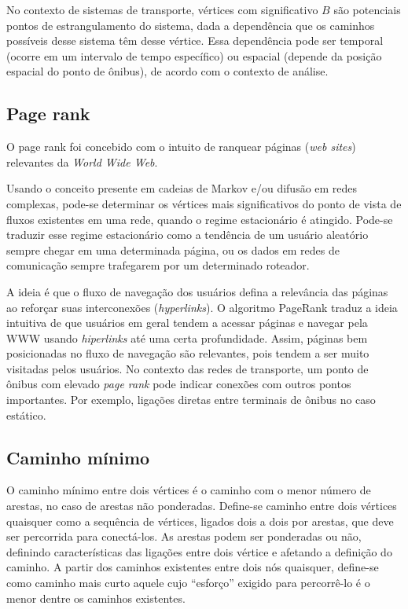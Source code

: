 No contexto de sistemas de transporte, vértices com significativo $B$ são potenciais pontos de estrangulamento do sistema, dada a dependência que os caminhos possíveis desse sistema têm desse vértice. Essa dependência pode ser temporal (ocorre em um intervalo de tempo específico) ou espacial (depende da posição espacial do ponto de ônibus), de acordo com o contexto de análise.

\subsection{Page rank}


O page rank foi concebido com o intuito de ranquear páginas (\emph{web sites}) relevantes da \emph{World Wide Web}. 

Usando o conceito presente em cadeias de Markov e/ou difusão em redes complexas, pode-se determinar os vértices mais significativos do ponto de vista de fluxos existentes em uma rede, quando o regime estacionário é atingido. Pode-se traduzir esse regime estacionário como a tendência de um usuário aleatório sempre chegar em uma determinada página, ou os dados em redes de comunicação sempre trafegarem por um determinado roteador.

A ideia é que o fluxo de navegação dos usuários defina a relevância das páginas ao reforçar suas interconexões (\emph{hyperlinks}). O algoritmo PageRank \cite{brin:98} traduz a ideia intuitiva de que usuários em geral tendem a acessar páginas e navegar pela WWW usando \emph{hiperlinks} até uma certa profundidade. Assim, páginas bem posicionadas no fluxo de navegação são relevantes, pois tendem a ser muito visitadas pelos usuários. 
No contexto das redes de transporte, um ponto de ônibus com elevado \emph{page rank} pode indicar conexões com outros pontos importantes. Por exemplo, ligações diretas entre terminais de ônibus no caso estático.


\subsection{Caminho mínimo}

O caminho mínimo entre dois vértices é o caminho com o menor número de arestas, no caso de arestas não ponderadas. 
Define-se caminho entre dois vértices quaisquer como a sequência de vértices, ligados dois a dois por arestas, que deve ser percorrida para conectá-los. As arestas podem ser ponderadas ou não, definindo características das ligações entre dois vértice e afetando a definição do caminho. A partir dos caminhos existentes entre dois nós quaisquer, define-se como caminho mais curto aquele cujo ``esforço'' exigido para percorrê-lo é o menor dentre os caminhos existentes.

